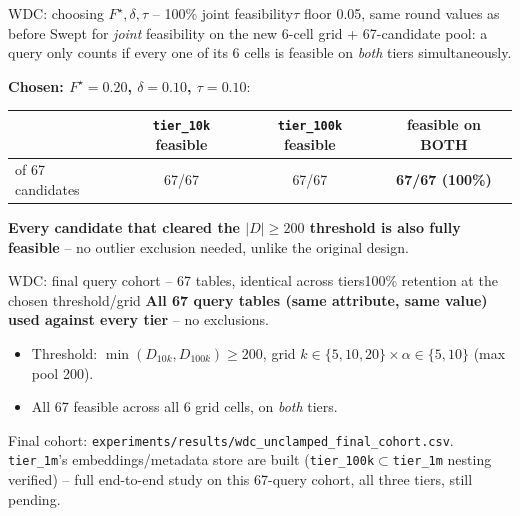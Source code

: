 \documentclass[aspectratio=169,10pt]{beamer}
\newcommand{\highlight}[1]{{\color{Cat1}\bfseries #1}}
\begin{document}
\begin{frame}{WDC: choosing $F^\star,\delta,\tau$ -- 100\% joint feasibility}{$\tau$ floor 0.05, same round values as before}
\small
Swept for \emph{joint} feasibility on the new 6-cell grid + 67-candidate pool: a query only counts if every one of its 6 cells is feasible on \emph{both} tiers simultaneously.

\vspace{6pt}
\textbf{Chosen: $F^\star{=}0.20$, $\delta{=}0.10$, $\tau{=}0.10$}:

\begin{center}
\begin{tabular}{lccc}
\toprule
& \texttt{tier\_10k} feasible & \texttt{tier\_100k} feasible & \textbf{feasible on BOTH} \\
\midrule
of 67 candidates & 67/67 & 67/67 & \textbf{67/67 (100\%)} \\
\bottomrule
\end{tabular}
\end{center}

\vspace{4pt}
\highlight{Every candidate that cleared the $|D|\geq 200$ threshold is also fully feasible} -- no outlier exclusion needed, unlike the original design.
\end{frame}

\begin{frame}{WDC: final query cohort -- 67 tables, identical across tiers}{100\% retention at the chosen threshold/grid}
\small
\textbf{All 67 query tables (same attribute, same value) used against every tier} -- no exclusions.

\vspace{6pt}
\begin{itemize}
  \item Threshold: $\min(D_{10k},D_{100k})\geq 200$, grid $k\in\{5,10,20\}\times\alpha\in\{5,10\}$ (max pool 200).
  \item All 67 feasible across all 6 grid cells, on \emph{both} tiers.
\end{itemize}

\vspace{6pt}
{\footnotesize\color{Muted} Final cohort: \texttt{experiments/results/wdc\_unclamped\_final\_cohort.csv}. \texttt{tier\_1m}'s embeddings/metadata store are built (\texttt{tier\_100k}$\subset$\texttt{tier\_1m} nesting verified) -- full end-to-end study on this 67-query cohort, all three tiers, still pending.}
\end{frame}
\end{document}
